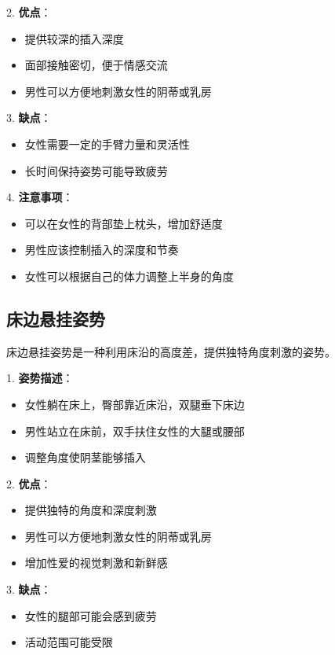 \documentclass[12pt,UTF8]{ctexbook}
\begin{document}
2. \textbf{优点}：
  \begin{itemize}
  \item 提供较深的插入深度
  \item 面部接触密切，便于情感交流
  \item 男性可以方便地刺激女性的阴蒂或乳房
  \end{itemize}

3. \textbf{缺点}：
  \begin{itemize}
  \item 女性需要一定的手臂力量和灵活性
  \item 长时间保持姿势可能导致疲劳
  \end{itemize}

4. \textbf{注意事项}：
  \begin{itemize}
  \item 可以在女性的背部垫上枕头，增加舒适度
  \item 男性应该控制插入的深度和节奏
  \item 女性可以根据自己的体力调整上半身的角度
  \end{itemize}

\subsection{床边悬挂姿势}

床边悬挂姿势是一种利用床沿的高度差，提供独特角度刺激的姿势。

1. \textbf{姿势描述}：
  \begin{itemize}
  \item 女性躺在床上，臀部靠近床沿，双腿垂下床边
  \item 男性站立在床前，双手扶住女性的大腿或腰部
  \item 调整角度使阴茎能够插入
  \end{itemize}

2. \textbf{优点}：
  \begin{itemize}
  \item 提供独特的角度和深度刺激
  \item 男性可以方便地刺激女性的阴蒂或乳房
  \item 增加性爱的视觉刺激和新鲜感
  \end{itemize}

3. \textbf{缺点}：
  \begin{itemize}
  \item 女性的腿部可能会感到疲劳
  \item 活动范围可能受限
  \end{itemize}
\end{document}
